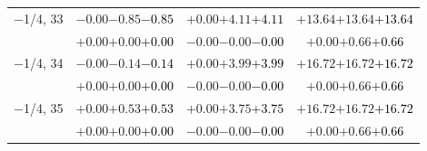 \documentclass[compress]{beamer}
\begin{document}
\begin{frame}
\begin{tabular}{r | c | c | c}
$-$1/4, 33 & $-0.00$\hspace{0.1 cm}$-0.85$\hspace{0.1 cm}\textcolor{black}{$-0.85$} & $+0.00$\hspace{0.1 cm}$+4.11$\hspace{0.1 cm}\textcolor{black}{$+4.11$} & $+13.64$\hspace{0.1 cm}$+13.64$\hspace{0.1 cm}\textcolor{black}{$+13.64$} \\
           & $+0.00$\hspace{0.1 cm}$+0.00$\hspace{0.1 cm}\textcolor{black}{$+0.00$} & $-0.00$\hspace{0.1 cm}$-0.00$\hspace{0.1 cm}\textcolor{black}{$-0.00$} & $+0.00$\hspace{0.1 cm}$+0.66$\hspace{0.1 cm}\textcolor{black}{$+0.66$} \\
$-$1/4, 34 & $-0.00$\hspace{0.1 cm}$-0.14$\hspace{0.1 cm}\textcolor{black}{$-0.14$} & $+0.00$\hspace{0.1 cm}$+3.99$\hspace{0.1 cm}\textcolor{black}{$+3.99$} & $+16.72$\hspace{0.1 cm}$+16.72$\hspace{0.1 cm}\textcolor{black}{$+16.72$} \\
           & $+0.00$\hspace{0.1 cm}$+0.00$\hspace{0.1 cm}\textcolor{black}{$+0.00$} & $-0.00$\hspace{0.1 cm}$-0.00$\hspace{0.1 cm}\textcolor{black}{$-0.00$} & $+0.00$\hspace{0.1 cm}$+0.66$\hspace{0.1 cm}\textcolor{black}{$+0.66$} \\
$-$1/4, 35 & $+0.00$\hspace{0.1 cm}$+0.53$\hspace{0.1 cm}\textcolor{black}{$+0.53$} & $+0.00$\hspace{0.1 cm}$+3.75$\hspace{0.1 cm}\textcolor{black}{$+3.75$} & $+16.72$\hspace{0.1 cm}$+16.72$\hspace{0.1 cm}\textcolor{black}{$+16.72$} \\
           & $+0.00$\hspace{0.1 cm}$+0.00$\hspace{0.1 cm}\textcolor{black}{$+0.00$} & $-0.00$\hspace{0.1 cm}$-0.00$\hspace{0.1 cm}\textcolor{black}{$-0.00$} & $+0.00$\hspace{0.1 cm}$+0.66$\hspace{0.1 cm}\textcolor{black}{$+0.66$} \\

\end{tabular}
\end{frame}
\end{document}
